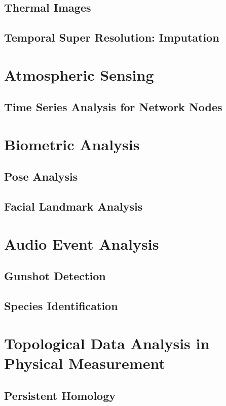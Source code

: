 \documentclass[doublespacing]{utdthesis}
\begin{document}
\section{Thermal Images}
\label{s:sr with thermal}
\section{Temporal Super Resolution: Imputation}
\label{s:sr with time}

\chapter{Atmospheric Sensing}
\label{c:atmospheric sensing}
\section{Time Series Analysis for Network Nodes}
\label{s:time series}


\chapter{Biometric Analysis}
\label{c:biometrics}
\section{Pose Analysis}
\label{s:pose}
\section{Facial Landmark Analysis}
\label{s:face}

\chapter{Audio Event Analysis}
\label{c: Audio}
\section{Gunshot Detection}
\label{s:guns}
\section{Species Identification}
\label{s:birds}

\chapter{Topological Data Analysis in Physical Measurement}
\label{c:tda}
\section{Persistent Homology}
\label{s:homology}
\end{document}
